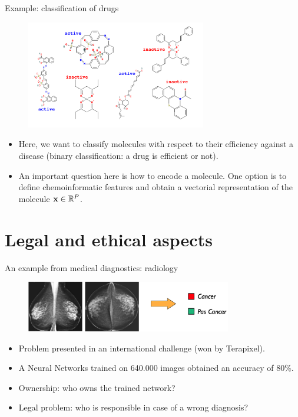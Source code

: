 \documentclass[xcolor=pdftex,dvipsnames,table]{beamer}
\begin{document}
\begin{frame}{Example: classification of drugs}
\begin{figure}[htb]
\includegraphics[width=0.7\textwidth]{../graphics/ml_example_drugs.pdf}
\end{figure}
\begin{itemize}
	\item Here, we want to classify molecules with respect to their efficiency against a disease (binary classification: a drug is efficient or not).
	\item An important question here is how to encode a molecule. One option is to define chemoinformatic features and obtain a vectorial representation of the molecule $\mathbf{x} \in \mathbb{R}^{P}$.
\end{itemize}
\end{frame}


\section{Legal and ethical aspects}
\begin{frame}{An example from  medical diagnostics: radiology}
\begin{figure}[htb]
\includegraphics[width=0.8\textwidth]{../graphics/radiology.pdf}
\end{figure}

\begin{itemize}
\item<1-> Problem presented in an international challenge (won by Terapixel). 
\item<2-> A Neural Networks trained on 640.000 images obtained an accuracy of 80\%. \
\item<3-> Ownership: who owns the trained network? 
\item<4-> Legal problem: who is responsible in case of a wrong diagnosis? 
\end{itemize}
\end{frame}
\end{document}
